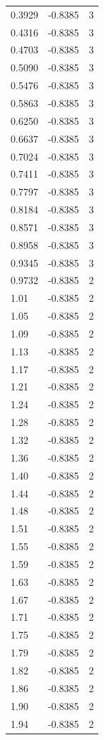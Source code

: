 \begin{longtable}{lrr}
  0.3929 & -0.8385 & 3 \\
  0.4316 & -0.8385 & 3 \\
  0.4703 & -0.8385 & 3 \\
  0.5090 & -0.8385 & 3 \\
  0.5476 & -0.8385 & 3 \\
  0.5863 & -0.8385 & 3 \\
  0.6250 & -0.8385 & 3 \\
  0.6637 & -0.8385 & 3 \\
  0.7024 & -0.8385 & 3 \\
  0.7411 & -0.8385 & 3 \\
  0.7797 & -0.8385 & 3 \\
  0.8184 & -0.8385 & 3 \\
  0.8571 & -0.8385 & 3 \\
  0.8958 & -0.8385 & 3 \\
  0.9345 & -0.8385 & 3 \\
  0.9732 & -0.8385 & 2 \\
  1.01 & -0.8385 & 2 \\
  1.05 & -0.8385 & 2 \\
  1.09 & -0.8385 & 2 \\
  1.13 & -0.8385 & 2 \\
  1.17 & -0.8385 & 2 \\
  1.21 & -0.8385 & 2 \\
  1.24 & -0.8385 & 2 \\
  1.28 & -0.8385 & 2 \\
  1.32 & -0.8385 & 2 \\
  1.36 & -0.8385 & 2 \\
  1.40 & -0.8385 & 2 \\
  1.44 & -0.8385 & 2 \\
  1.48 & -0.8385 & 2 \\
  1.51 & -0.8385 & 2 \\
  1.55 & -0.8385 & 2 \\
  1.59 & -0.8385 & 2 \\
  1.63 & -0.8385 & 2 \\
  1.67 & -0.8385 & 2 \\
  1.71 & -0.8385 & 2 \\
  1.75 & -0.8385 & 2 \\
  1.79 & -0.8385 & 2 \\
  1.82 & -0.8385 & 2 \\
  1.86 & -0.8385 & 2 \\
  1.90 & -0.8385 & 2 \\
  1.94 & -0.8385 & 2 \\

\end{longtable}
